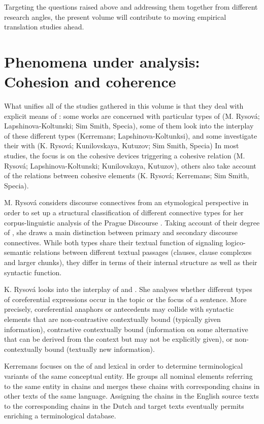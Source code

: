\documentclass[output=paper]{langsci/langscibook.cls}
\begin{document}
	Targeting the questions raised above and addressing them together from different research angles, the present volume will contribute to moving empirical translation studies ahead.
	
	\section{Phenomena under analysis: Cohesion and coherence}
	
	What unifies all of the studies gathered in this volume is that they deal with explicit means of : some works are concerned with particular types of  (M. Rysov\'{a}; Lapshinova-Koltunski; Sim Smith, Specia), some of them look into the interplay of these different types (Kerremans; Lapshinova-Koltunksi), and some investigate their  with  (K. Rysov\'{a};  Kunilovskaya, Kutuzov; Sim Smith, Specia) In most studies, the focus is on the cohesive devices triggering a cohesive relation (M. Rysov\'{a}; Lapshinova-Koltunski; Kunilovskaya, Kutuzov), others also take account of the relations between cohesive elements (K. Rysov\'{a}; Kerremans; Sim Smith, Specia).

M. Rysov\'{a} considers discourse connectives from an etymological perspective in order to set up a structural classification of different connective types for her corpus-linguistic analysis of the Prague Discourse . Taking account of their degree of , she draws a main distinction between primary and secondary discourse connectives. While both types share their textual function of signaling logico-semantic relations between different textual passages (clauses, clause complexes and larger chunks), they differ in terms of their internal structure as well as their syntactic function. 

K. Rysov\'{a} looks into the interplay of  and . She analyses whether different types of coreferential expressions occur in the topic or the focus of a sentence. More precisely, coreferential anaphors or antecedents may collide with syntactic elements that are non-contrastive contextually bound (typically given information), contrastive contextually bound (information on some alternative that can be derived from the context but may not be explicitly given), or non-contextually bound (textually new information). 

Kerremans focuses on the  of  and lexical  in order to determine terminological variants of the same conceptual entity. He groups all nominal elements referring to the same entity in  chains and merges these chains with corresponding chains in other texts of the same language. Assigning the  chains in the English source texts to the corresponding chains in the Dutch and  target texts eventually permits enriching a terminological database. 
\end{document}
